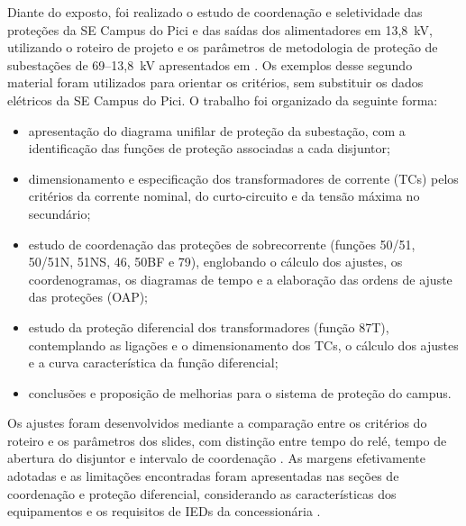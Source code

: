 Diante do exposto, foi realizado o estudo de coordenação e seletividade das proteções da SE Campus do Pici e das saídas dos alimentadores em 13,8~kV, utilizando o roteiro de projeto e os parâmetros de metodologia de proteção de subestações de 69--13,8~kV apresentados em \cite{sampaio2026roteiro,cysne2026protecao}. Os exemplos desse segundo material foram utilizados para orientar os critérios, sem substituir os dados elétricos da SE Campus do Pici. O trabalho foi organizado da seguinte forma:

\begin{itemize}
    \item[--] apresentação do diagrama unifilar de proteção da subestação, com a identificação das funções de proteção associadas a cada disjuntor;
    \item[--] dimensionamento e especificação dos transformadores de corrente (TCs) pelos critérios da corrente nominal, do curto-circuito e da tensão máxima no secundário;
    \item[--] estudo de coordenação das proteções de sobrecorrente (funções 50/51, 50/51N, 51NS, 46, 50BF e 79), englobando o cálculo dos ajustes, os coordenogramas, os diagramas de tempo e a elaboração das ordens de ajuste das proteções (OAP);
    \item[--] estudo da proteção diferencial dos transformadores (função 87T), contemplando as ligações e o dimensionamento dos TCs, o cálculo dos ajustes e a curva característica da função diferencial;
    \item[--] conclusões e proposição de melhorias para o sistema de proteção do campus.
\end{itemize}

Os ajustes foram desenvolvidos mediante a comparação entre os critérios do roteiro e os parâmetros dos slides, com distinção entre tempo do relé, tempo de abertura do disjuntor e intervalo de coordenação \cite{sampaio2026roteiro,cysne2026protecao}. As margens efetivamente adotadas e as limitações encontradas foram apresentadas nas seções de coordenação e proteção diferencial, considerando as características dos equipamentos e os requisitos de IEDs da concessionária \cite{sel2013sel751,enel2022et2178}.
